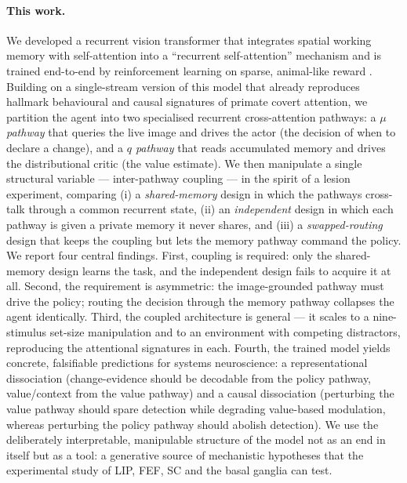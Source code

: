 \paragraph{This work.}
We developed a recurrent vision transformer that integrates spatial working memory
with self-attention into a ``recurrent self-attention'' mechanism and is trained
end-to-end by reinforcement learning on sparse, animal-like reward
\citep{springenberg2024offline, bellemare2017distributional}. Building on a
single-stream version of this model that already reproduces hallmark behavioural
and causal signatures of primate covert attention, we partition the agent into two
specialised recurrent cross-attention pathways: a \emph{$\mu$ pathway} that queries
the live image and drives the actor (the decision of when to declare a change), and
a \emph{$q$ pathway} that reads accumulated memory and drives the distributional
critic (the value estimate). We then manipulate a single structural variable ---
inter-pathway coupling --- in the spirit of a lesion experiment, comparing (i) a
\emph{shared-memory} design in which the pathways cross-talk through a common
recurrent state, (ii) an \emph{independent} design in which each pathway is given a
private memory it never shares, and (iii) a \emph{swapped-routing} design that keeps
the coupling but lets the memory pathway command the policy. We report four central
findings. First, coupling is required: only the shared-memory design learns the task,
and the independent design fails to acquire it at all. Second, the requirement is
asymmetric: the image-grounded pathway must drive the policy; routing the decision
through the memory pathway collapses the agent identically. Third, the coupled
architecture is general --- it scales to a nine-stimulus set-size manipulation and to
an environment with competing distractors, reproducing the attentional signatures in
each. Fourth, the trained model yields concrete, falsifiable predictions for systems
neuroscience: a representational dissociation (change-evidence should be decodable
from the policy pathway, value/context from the value pathway) and a causal
dissociation (perturbing the value pathway should spare detection while degrading
value-based modulation, whereas perturbing the policy pathway should abolish
detection). We use the deliberately interpretable, manipulable structure of the
model not as an end in itself but as a tool: a generative source of mechanistic
hypotheses that the experimental study of LIP, FEF, SC and the basal ganglia can
test.

